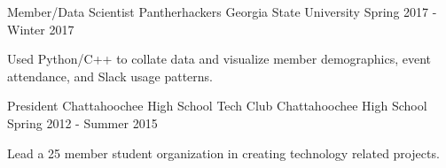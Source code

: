 

\begin{cventries}

  \cventry
    {Member/Data Scientist} %
    {Pantherhackers} %
    {Georgia State University} %
    {Spring 2017 - Winter 2017} %
    {
      \begin{cvitems} %
        \item {Used Python/C++ to collate data and visualize member demographics, event attendance, and Slack usage patterns.}
      \end{cvitems}
    }

  \cventry
    {President} %
    {Chattahoochee High School Tech Club} %
    {Chattahoochee High School} %
    {Spring 2012 - Summer 2015} %
    {
      \begin{cvitems} %
        \item {Lead a 25 member student organization in creating technology related projects.}
      \end{cvitems}
    }

\end{cventries}

